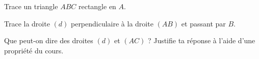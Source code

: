 \begin{myenumerate}
  \item Trace un triangle $ABC$ rectangle en $A$.
  \item Trace la droite $(d)$ perpendiculaire à la droite $(AB)$ et
    passant par $B$.
  \item Que peut-on dire des droites $(d)$ et $(AC)$ ? Justifie ta
    réponse à l'aide d'une propriété du cours.
\end{myenumerate}